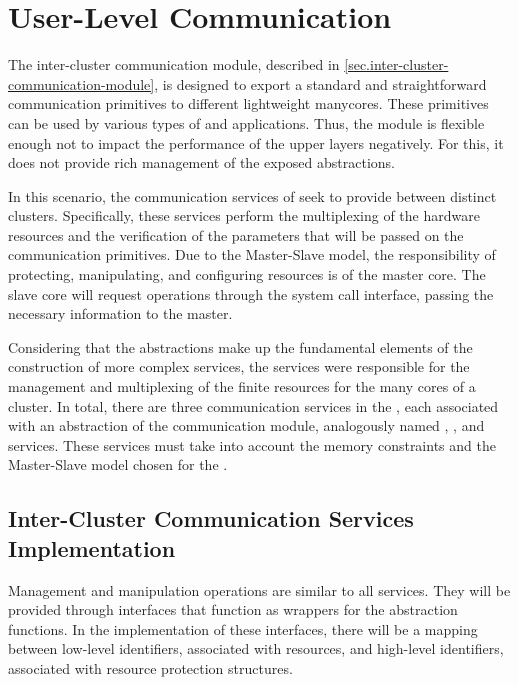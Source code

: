 
	\section{User-Level Communication}
	\label{sec.comm-services}

		The inter-cluster communication module, described in \autoref{sec.inter-cluster-communication-module},
		is designed to export a standard and straightforward communication
		primitives to different lightweight manycores.
		These primitives can be used by various types of \oss and applications.
		Thus, the module is flexible enough not to impact the performance
		of the upper layers negatively.
		For this, it does not provide rich management of the exposed abstractions.

		In this scenario, the communication services of \nanvix \microkernel seek
		to provide \ipc between distinct clusters.
		Specifically, these services perform the multiplexing of the hardware
		resources and the verification of the parameters that will be passed
		on the communication primitives.
		Due to the Master-Slave model, the responsibility of protecting,
		manipulating, and configuring \hal resources is of the master core.
		The slave core will request operations through the system call interface,
		passing the necessary information to the master.

		Considering that the abstractions make up the fundamental elements of
		the construction of more complex services, the \microkernel services
		were responsible for the management and multiplexing of the finite
		resources for the many cores of a cluster.
		In total, there are three communication services in the \nanvix \microkernel,
		each associated with an abstraction of the communication module,
		analogously named \sync, \mailbox, and \portal services.
		These services must take into account the memory constraints and the
		Master-Slave model chosen for the \microkernel.

		\subsection{Inter-Cluster Communication Services Implementation}

			Management and manipulation operations are similar to all services.
			They will be provided through interfaces that function as wrappers
			for the \hal abstraction functions.
			In the implementation of these interfaces, there will be a mapping
			between low-level identifiers, associated with \hal resources,
			and high-level identifiers, associated with resource protection structures.

